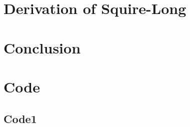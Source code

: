 \documentclass{X:/Documents/Coding/Latex/myreport}
\theoremstyle{plain}
\theoremstyle{definition}
\theoremstyle{remark}
\numberwithin{equation}{section}
\numberwithin{figure}{section}
\begin{document}
\begin{appendices}
\chapter{Derivation of Squire-Long}

\chapter{Conclusion}
\chapter{Code}
\section{Code1}
	
\end{appendices}


















\begin{thebibliography}{9}
%
%







\end{thebibliography}
\end{document}
